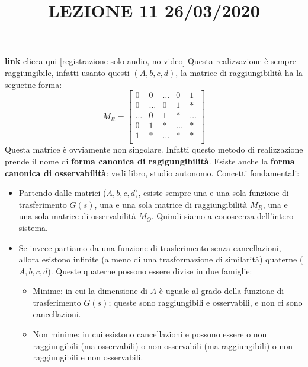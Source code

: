 \newline
\newline
\title{LEZIONE 11 26/03/2020}\newline
\textbf{link} \href{https://web.microsoftstream.com/video/55dca95e-fe7f-4bf2-82e6-d3024939e5c3?list=user&userId=faa91214-a6f5-40d7-8875-253fd49b8ce1}{clicca qui} [registrazione solo audio, no video]\newline
\newline
Questa realizzazione è sempre raggiungibile, infatti usanto questi $(A,b,c,d)$, la matrice di raggiungibilità ha la seguetne forma:
\[
    M_R = \left[\begin{matrix}
        0     & 0     & \dots & 0     & 1    \\
        0     & \dots & 0     & 1     & *    \\
        \dots & 0     & 1     & *     & \dots\\
        0     & 1     & *     & \dots & *    \\
        1     & *     & \dots & *     & *    \\
    \end{matrix}\right]
\]
Questa matrice è ovviamente non singolare.\newline
\newline
Infatti questo metodo di realizzazione prende il nome di \textbf{forma canonica di ragigungibilità}.\newline
\newline
Esiste anche la \textbf{forma canonica di osservabilità}: vedi libro, studio autonomo.\newline
\newline
Concetti fondamentali:
\begin{itemize}
    \item Partendo dalle matrici ($A,b,c,d$), esiste sempre una e una sola funzione di trasferimento $G(s)$, una e una sola matrice di raggiungibilità $M_R$, una e una sola matrice di osservabilità $M_O$. Quindi siamo a conoscenza dell'intero sistema.
    \item Se invece partiamo da una funzione di trasferimento senza cancellazioni, allora esistono infinite (a meno di una trasformazione di similarità) quaterne ($A,b,c,d$). Queste quaterne possono essere divise in due famiglie:
    \begin{itemize}
        \item Minime: in cui la dimensione di $A$ è uguale al grado della funzione di trasferimento $G(s)$; queste sono raggiungibili e osservabili, e non ci sono cancellazioni.
        \item Non minime: in cui esistono cancellazioni e possono essere o non raggiungibili (ma osservabili) o non osservabili (ma raggiungibili) o non raggiungibili e non osservabili.
    \end{itemize}
\end{itemize}
